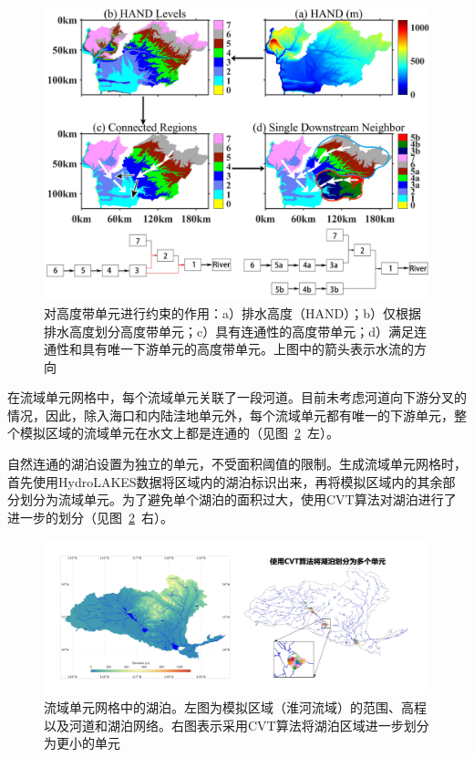 {
\begin{figure}[htbp]
\centering
\includegraphics[width=\textwidth]{Figures/模式构架/高度带单元的约束示意图.jpg}
\caption[对高度带单元进行约束的作用]{对高度带单元进行约束的作用：a）排水高度（HAND）；b）仅根据排水高度划分高度带单元；c）具有连通性的高度带单元；d）满足连通性和具有唯一下游单元的高度带单元。上图中的箭头表示水流的方向}
\label{fig:高度带单元约束示意}
\end{figure}
}

在流域单元网格中，每个流域单元关联了一段河道。目前未考虑河道向下游分叉的情况，因此，除入海口和内陆洼地单元外，每个流域单元都有唯一的下游单元，整个模拟区域的流域单元在水文上都是连通的（见图~\ref{fig:湖泊划分}~左）。

自然连通的湖泊设置为独立的单元，不受面积阈值的限制。生成流域单元网格时，首先使用HydroLAKES数据\citep{messager2016nc}将区域内的湖泊标识出来，再将模拟区域内的其余部分划分为流域单元。为了避免单个湖泊的面积过大，使用CVT算法\citep{du1999siam}对湖泊进行了进一步的划分（见图~\ref{fig:湖泊划分}~右）。
{
\begin{figure}[htbp]
\centering
\includegraphics[width=\textwidth]{Figures/模式构架/湖泊划分.jpg}
\caption[流域单元网格中的湖泊]{流域单元网格中的湖泊。左图为模拟区域（淮河流域）的范围、高程以及河道和湖泊网络。右图表示采用CVT算法将湖泊区域进一步划分为更小的单元}
\label{fig:湖泊划分}
\end{figure}
}



